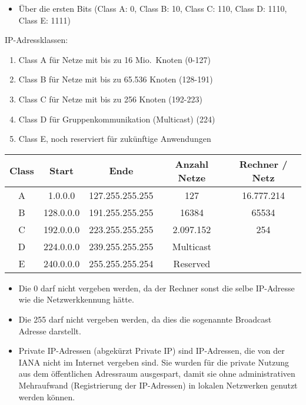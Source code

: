 \begin{itemize}
    \item Über die ersten Bits (Class A: 0, Class B: 10, Class C: 110, Class D: 1110, Class E: 1111)
\end{itemize}

IP-Adressklassen:
\begin{enumerate}
    \item Class A für Netze mit bis zu 16 Mio.\ Knoten (0-127)
    \item Class B für Netze mit bis zu 65.536 Knoten (128-191)
    \item Class C für Netze mit bis zu 256 Knoten (192-223)
    \item Class D für Gruppenkommunikation (Multicast) (224)
    \item Class E, noch reserviert für zukünftige Anwendungen
\end{enumerate}
\begin{center}
    \begin{tabular}{|c|c|c|c|c|}
        \hline
        Class & Start & Ende & Anzahl Netze & Rechner / Netz \tabularnewline
        \hline
        A & 1.0.0.0 & 127.255.255.255 & 127 & 16.777.214 \tabularnewline
        \hline
        B & 128.0.0.0 & 191.255.255.255 & 16384 & 65534 \tabularnewline
        \hline
        C & 192.0.0.0 & 223.255.255.255 & 2.097.152 & 254 \tabularnewline
        \hline
        D & 224.0.0.0 & 239.255.255.255 & Multicast & \tabularnewline
        \hline
        E & 240.0.0.0 & 255.255.255.254 & Reserved & \tabularnewline
        \hline
    \end{tabular}
\end{center}

\begin{itemize}
    \item Die 0 darf nicht vergeben werden, da der Rechner sonst die selbe IP-Adresse wie die Netzwerkkennung hätte.
    \item Die 255 darf nicht vergeben werden, da dies die sogenannte Broadcast Adresse darstellt.
\end{itemize}

\begin{itemize}
    \item Private IP-Adressen (abgekürzt Private IP) sind IP-Adressen, die von der IANA nicht im Internet vergeben sind.
    Sie wurden für die private Nutzung aus dem öffentlichen Adressraum ausgespart, damit sie ohne administrativen Mehraufwand (Registrierung der IP-Adressen) in lokalen Netzwerken genutzt werden können.
\end{itemize}

